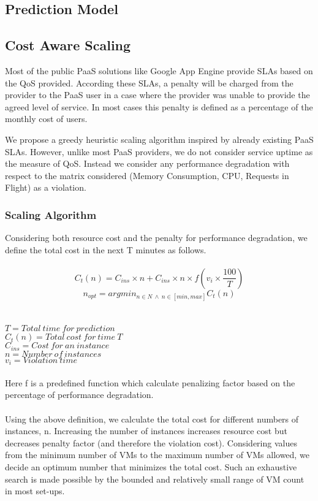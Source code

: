 \subsection{Prediction Model}

\subsection{Cost Aware Scaling}
Most of the public PaaS solutions like Google App Engine provide SLAs based on the QoS provided. According these SLAs, a penalty will be charged from the provider to the PaaS user in a case where the provider was unable to provide the agreed level of service. In most cases this penalty is defined as a percentage of the monthly cost of users.

We propose a greedy heuristic scaling algorithm inspired by already existing PaaS SLAs. However, unlike most PaaS providers, we do not consider service uptime as the measure of QoS. Instead we consider any performance degradation with respect to the matrix considered (Memory Consumption, CPU, Requests in Flight) as a violation.

\subsubsection{Scaling Algorithm}
Considering both resource cost and the penalty for performance degradation, we define the total cost in the next T minutes as follows.\\
\\
\textbf{$$ C_t(n) = C_{ins} \times n  +  C_{ins} \times n \times f(v_i \times \frac{100}{T}) $$}
\textbf{$$n_{opt} = argmin_{n \in N \ \land \ n \in [min, max]}C_t(n)$$} \\
\\
$T       = Total\ time\ for\ prediction $ \\
$C_t(n)  = Total\ cost\ for\ time\ T $ \\
$C_{ins} = Cost\ for\ an\ instance$   \\
$n       = Number\ of\ instances $  \\
$v_i     = Violation\ time $ \\
\\
Here f is a predefined function which calculate penalizing factor based on the percentage of performance degradation.\\
\\
Using the above definition, we calculate the total cost for different numbers of instances, n. Increasing the number of instances increases resource cost but decreases penalty factor (and therefore the violation cost). Considering values from the minimum number of VMs to the maximum number of VMs allowed, we decide an optimum number that minimizes the total cost. Such an exhaustive search is made possible by the bounded and relatively small range of VM count in most set-ups.
